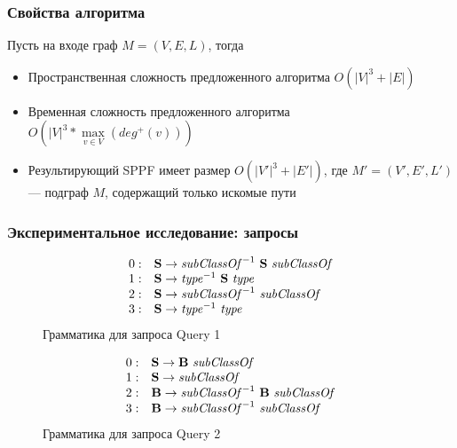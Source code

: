 \documentclass[xcolor=table,aspectratio=169]{beamer}
\begin{document}
\begin{frame}
  \transwipe[direction=90]
  \frametitle{Свойства алгоритма}

Пусть на входе граф $M=(V,E,L)$, тогда
\begin{itemize} 
\item Пространственная сложность предложенного алгоритма $O(|V|^3 + |E|)$
\item Временная сложность предложенного алгоритма $O\left(|V|^3*\max\limits_{v \in V}\left(deg^+\left(v\right)\right)\right)$
\item Результирующий SPPF имеет размер $O(|V'|^3 + |E'|)$, где $M'=(V',E',L')$ --- подграф $M$, содержащий только искомые пути
\end{itemize}

\end{frame}

\begin{frame}[fragile]
\transwipe[direction=90]
\frametitle{Экспериментальное исследование: запросы}
\begin{figure}[ht]
   \centering

   \[
\begin{array}{rl}
   0: & \textbf{S} \rightarrow \text{\textit{subClassOf}}^{-1} \ \textbf{S} \ \text{\textit{subClassOf}} \\ 
   1: & \textbf{S} \rightarrow \text{\textit{type}}^{-1} \ \textbf{S} \ \text{\textit{type}} \\ 
   2: & \textbf{S} \rightarrow \text{\textit{subClassOf}}^{-1} \ \text{\textit{subClassOf}} \\ 
   3: & \textbf{S} \rightarrow \text{\textit{type}}^{-1} \ \text{\textit{type}} \\ 
\end{array}
\]
   Грамматика для запроса Query 1
   \end{figure}
\begin{figure}[h]%
   \centering

   \[
\begin{array}{rl}
   0: & \textbf{S} \rightarrow \textbf{B} \ \text{\textit{subClassOf}} \\ 
   1: & \textbf{S} \rightarrow \text{\textit{subClassOf}} \\ 
   2: & \textbf{B} \rightarrow \text{\textit{subClassOf}}^{-1} \ \textbf{B} \ \text{\textit{subClassOf}} \\
   3: & \textbf{B} \rightarrow \text{\textit{subClassOf}}^{-1} \ \text{\textit{subClassOf}} \\ 
\end{array}
\]
   Грамматика для запроса Query 2

   \end{figure}

\end{frame}
\end{document}
